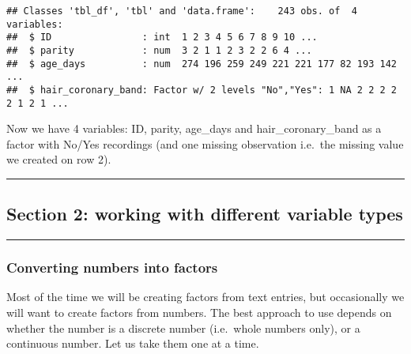 \documentclass[
]{article}
\newenvironment{Shaded}{\begin{snugshade}}{\end{snugshade}}
\newcommand{\KeywordTok}[1]{\textcolor[rgb]{0.13,0.29,0.53}{\textbf{#1}}}
\newcommand{\NormalTok}[1]{#1}
\newcommand{\OperatorTok}[1]{\textcolor[rgb]{0.81,0.36,0.00}{\textbf{#1}}}
\newcommand{\StringTok}[1]{\textcolor[rgb]{0.31,0.60,0.02}{#1}}
\begin{document}
\begin{Shaded}
\end{Shaded}

\begin{verbatim}
## Classes 'tbl_df', 'tbl' and 'data.frame':    243 obs. of  4 variables:
##  $ ID                : int  1 2 3 4 5 6 7 8 9 10 ...
##  $ parity            : num  3 2 1 1 2 3 2 2 6 4 ...
##  $ age_days          : num  274 196 259 249 221 221 177 82 193 142 ...
##  $ hair_coronary_band: Factor w/ 2 levels "No","Yes": 1 NA 2 2 2 2 2 1 2 1 ...
\end{verbatim}

Now we have 4 variables: ID, parity, age\_days and hair\_coronary\_band
as a factor with No/Yes recordings (and one missing observation i.e.~the
missing value we created on row 2).

\begin{center}\rule{0.5\linewidth}{0.5pt}\end{center}

\hypertarget{section-2-working-with-different-variable-types}{%
\subsection{Section 2: working with different variable
types}\label{section-2-working-with-different-variable-types}}

\begin{center}\rule{0.5\linewidth}{0.5pt}\end{center}

\hypertarget{converting-numbers-into-factors}{%
\subsubsection{Converting numbers into
factors}\label{converting-numbers-into-factors}}

Most of the time we will be creating factors from text entries, but
occasionally we will want to create factors from numbers. The best
approach to use depends on whether the number is a discrete number
(i.e.~whole numbers only), or a continuous number. Let us take them one
at a time.
\end{document}
